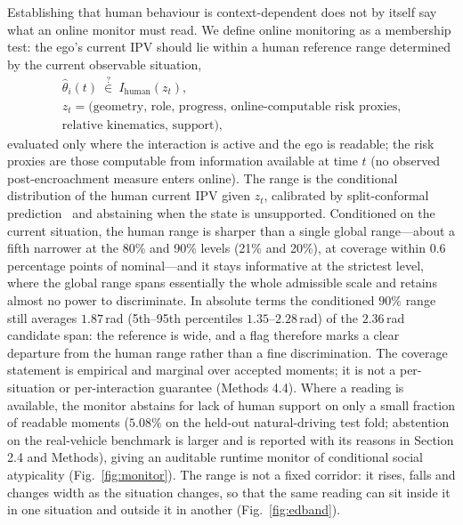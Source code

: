 \documentclass[12pt,a4paper]{article}
\begin{document}
Establishing that human behaviour is context-dependent does not by itself say what an online monitor
must read. We define online monitoring as a membership test: the ego's current IPV should lie within
a human reference range determined by the current observable situation,
\begin{equation}
\begin{gathered}
  \hat\theta_i(t)\ \stackrel{?}{\in}\ I_{\mathrm{human}}(z_t),\\
  z_t=\big(\text{geometry, role, progress, online-computable risk proxies,}\\
  \text{relative kinematics, support}\big),
\end{gathered}
  \label{eq:membership}
\end{equation}
evaluated only where the interaction is active and the ego is readable; the risk proxies are those
computable from information available at time $t$ (no observed post-encroachment measure enters
online). The range is the conditional
distribution of the human current IPV given $z_t$, calibrated by split-conformal
prediction~\cite{vovk2005algorithmic,romano2019cqr} and
abstaining when the state is unsupported. Conditioned on the current situation, the human range is
sharper than a single global range---about a fifth narrower at the 80\% and 90\% levels (21\% and
20\%), at coverage within 0.6 percentage points of nominal---and it stays informative at the
strictest level, where the global range spans essentially the whole admissible scale and retains
almost no power to discriminate. In absolute terms the conditioned $90\%$ range still averages $1.87$\,rad
(5th--95th percentiles $1.35$--$2.28$\,rad) of the $2.36$\,rad candidate span: the reference is wide,
and a flag therefore marks a clear departure from the human range rather than a fine discrimination.
The coverage statement is empirical and marginal over accepted moments; it is not a
per-situation or per-interaction guarantee (Methods 4.4). Where a reading is available, the monitor abstains for lack of human support on only a small
fraction of readable moments ($5.08\%$ on the held-out natural-driving test fold; abstention on the real-vehicle
benchmark is larger and is reported with its reasons in Section 2.4 and Methods), giving an auditable runtime monitor
of conditional social atypicality (Fig.~\ref{fig:monitor}). The range is not a fixed corridor:
it rises, falls and changes width as the situation changes, so that the same reading can sit inside it
in one situation and outside it in another (Fig.~\ref{fig:edband}).
\end{document}
